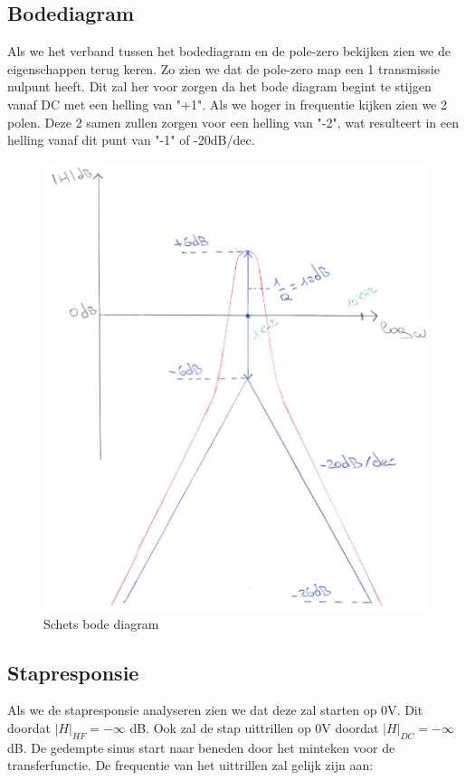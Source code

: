 \documentclass[]{article}
\begin{document}
\newpage

\subsection*{Bodediagram}

Als we het verband tussen het bodediagram en de pole-zero bekijken zien we de eigenschappen terug keren. Zo zien we dat de pole-zero map een 1 transmissie nulpunt heeft. Dit zal her voor zorgen da het bode diagram begint te stijgen vanaf DC met een helling van "+1". Als we hoger in frequentie kijken zien we 2 polen. Deze 2 samen zullen zorgen voor een helling van "-2", wat resulteert in een helling vanaf dit punt van "-1" of -20dB/dec.

\begin{figure}[H]
	\centering
	\includegraphics[width=12cm]{schets_bode}
	\caption{Schets bode diagram}
\end{figure}

\subsection*{Stapresponsie}

Als we de stapresponsie analyseren zien we dat deze zal starten op 0V. Dit doordat $|H|_{HF} = -\infty$ dB. Ook zal de stap uittrillen op 0V doordat $|H|_{DC} = -\infty$ dB. De gedempte sinus start naar beneden door het minteken voor de transferfunctie. De frequentie van het uittrillen zal gelijk zijn aan: 
\end{document}
